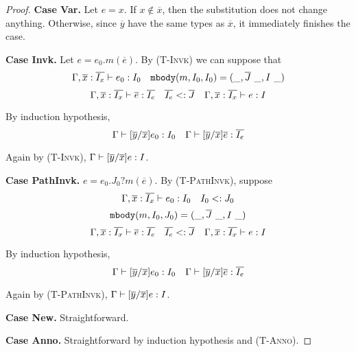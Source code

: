 \begin{lemma}
\begin{proof}
\textbf{Case Var.} Let $e = x$. If $x \notin \overline{x}$, then the substitution does not change anything. Otherwise,
since $\overline{y}$ have the same types as $\overline{x}$, it immediately finishes the case.

\textbf{Case Invk.} Let $e = e_0.m(\overline{e})$. By \textsc{(T-Invk)} we can suppose that
	$$\judgeewf {\Gamma, \overline{x}:\overline{I_x}} {e_0 : I_0} \quad \mbody(m, I_0, I_0) = (\_, \overline{J}\ \_, I\ \_)$$
	$$\Gamma, \overline{x}:\overline{I_x} \; {\vdash} \; \overline{e} : \overline{I_e} \quad 
	\overline{I_e} <: \overline{J} \quad \Gamma, \overline{x}:\overline{I_x} \; {\vdash} \; e : I$$
	
By induction hypothesis, 
	$$\Gamma \; {\vdash} \; [\overline{y}/\overline{x}]e_0 : I_0 \quad
	  \Gamma \; {\vdash} \; [\overline{y}/\overline{x}]\overline{e} : \overline{I_e}$$
	  
Again by \textsc{(T-Invk)}, $\Gamma \; {\vdash} \; [\overline{y}/\overline{x}]e : I$.

\textbf{Case PathInvk.} $e = e_0.J_0?m(\overline{e})$. By \textsc{(T-PathInvk)}, suppose
	$$\Gamma, \overline{x}:\overline{I_x} \; {\vdash} \; e_0 : I_0 \quad I_0 <: J_0$$
	$$\mbody(m, I_0, J_0) = (\_, \overline{J}\ \_, I\ \_)$$
	$$\Gamma, \overline{x}:\overline{I_x} \; {\vdash} \; \overline{e} : \overline{I_e} \quad 
	  \overline{I_e} <: \overline{J} \quad \Gamma, \overline{x}:\overline{I_x} \; {\vdash} \; e : I$$

By induction hypothesis, 
$$\Gamma \; {\vdash} \; [\overline{y}/\overline{x}]e_0 : I_0 \quad
\Gamma \; {\vdash} \; [\overline{y}/\overline{x}]\overline{e} : \overline{I_e}$$ 

Again by \textsc{(T-PathInvk)}, $\Gamma \; {\vdash} \; [\overline{y}/\overline{x}]e : I$.

\textbf{Case New.} Straightforward.

\textbf{Case Anno.} Straightforward by induction hypothesis and \textsc{(T-Anno)}.


\end{proof}

\end{lemma}



